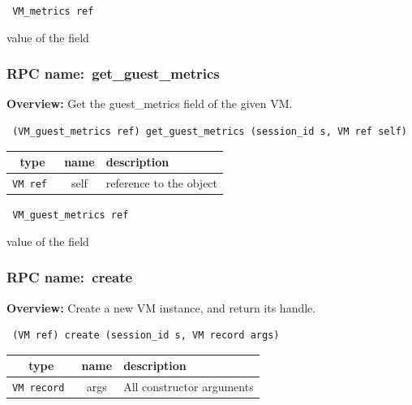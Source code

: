 \vspace{0.3cm}

{\tt 
VM\_metrics ref
}


value of the field
\vspace{0.3cm}
\vspace{0.3cm}
\vspace{0.3cm}
\subsubsection{RPC name:~get\_guest\_metrics}

{\bf Overview:} 
Get the guest\_metrics field of the given VM.

\begin{verbatim} (VM_guest_metrics ref) get_guest_metrics (session_id s, VM ref self)\end{verbatim}



 
\vspace{0.3cm}
\begin{tabular}{|c|c|p{7cm}|}
 \hline
{\bf type} & {\bf name} & {\bf description} \\ \hline
{\tt VM ref } & self & reference to the object \\ \hline 

\end{tabular}

\vspace{0.3cm}

{\tt 
VM\_guest\_metrics ref
}


value of the field
\vspace{0.3cm}
\vspace{0.3cm}
\vspace{0.3cm}
\subsubsection{RPC name:~create}

{\bf Overview:} 
Create a new VM instance, and return its handle.

\begin{verbatim} (VM ref) create (session_id s, VM record args)\end{verbatim}



 
\vspace{0.3cm}
\begin{tabular}{|c|c|p{7cm}|}
 \hline
{\bf type} & {\bf name} & {\bf description} \\ \hline
{\tt VM record } & args & All constructor arguments \\ \hline 

\end{tabular}

